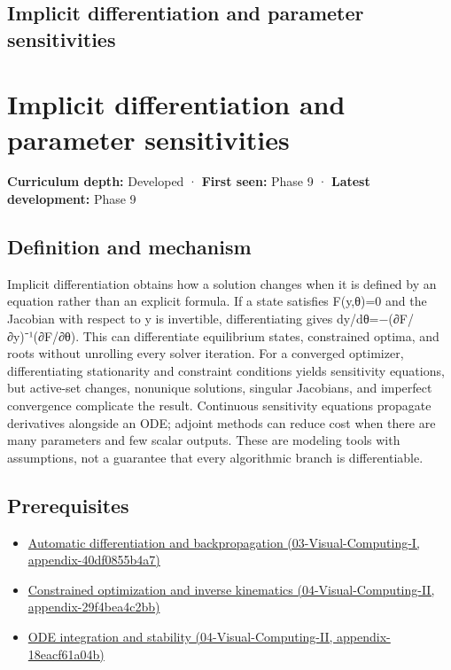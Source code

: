 \hypertarget{appendix-8836553d56fc}{}
\section*{Implicit differentiation and parameter sensitivities}
\chapter{Implicit differentiation and parameter sensitivities}\label{appendix-8836553d56fc-implicit-differentiation-and-parameter-sensitivities}

\textbf{Curriculum depth:} Developed · \textbf{First seen:} Phase 9 · \textbf{Latest development:} Phase 9

\section{Definition and mechanism}\label{appendix-8836553d56fc-definition-and-mechanism}

Implicit differentiation obtains how a solution changes when it is defined by an equation rather than an explicit formula. If a state satisfies F(y,θ)=0 and the Jacobian with respect to y is invertible, differentiating gives dy/dθ=−(∂F/∂y)⁻¹(∂F/∂θ). This can differentiate equilibrium states, constrained optima, and roots without unrolling every solver iteration. For a converged optimizer, differentiating stationarity and constraint conditions yields sensitivity equations, but active-set changes, nonunique solutions, singular Jacobians, and imperfect convergence complicate the result. Continuous sensitivity equations propagate derivatives alongside an ODE; adjoint methods can reduce cost when there are many parameters and few scalar outputs. These are modeling tools with assumptions, not a guarantee that every algorithmic branch is differentiable.

\section{Prerequisites}\label{appendix-8836553d56fc-prerequisites}

\begin{itemize}
\tightlist
\item
  \href{../03-Visual-Computing-I/main.pdf\#nameddest=appendix-40df0855b4a7}{Automatic differentiation and backpropagation (03-Visual-Computing-I, appendix-40df0855b4a7)}
\item
  \href{../04-Visual-Computing-II/main.pdf\#nameddest=appendix-29f4bea4c2bb}{Constrained optimization and inverse kinematics (04-Visual-Computing-II, appendix-29f4bea4c2bb)}
\item
  \href{../04-Visual-Computing-II/main.pdf\#nameddest=appendix-18eacf61a04b}{ODE integration and stability (04-Visual-Computing-II, appendix-18eacf61a04b)}
\end{itemize}

